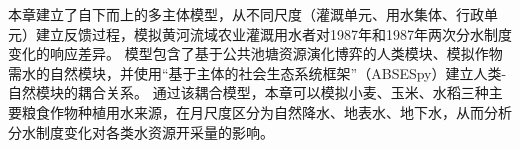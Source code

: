 
本章建立了自下而上的多主体模型，从不同尺度（灌溉单元、用水集体、行政单元）建立反馈过程，模拟黄河流域农业灌溉用水者对1987年和1987年两次分水制度变化的响应差异。
模型包含了基于公共池塘资源演化博弈的人类模块、模拟作物需水的自然模块，并使用“基于主体的社会\textendash{}生态系统框架”（ABSESpy）建立人类-自然模块的耦合关系。
通过该耦合模型，本章可以模拟小麦、玉米、水稻三种主要粮食作物种植用水来源，在月尺度区分为自然降水、地表水、地下水，从而分析分水制度变化对各类水资源开采量的影响。

